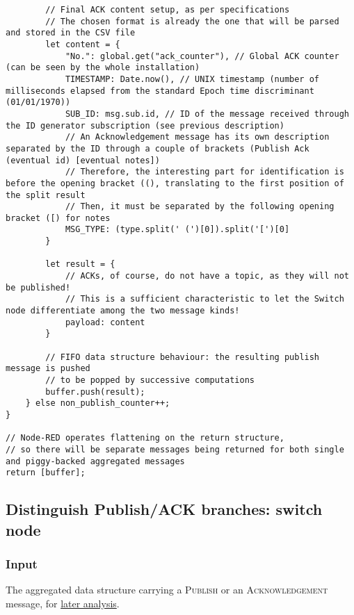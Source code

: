 \documentclass[a4paper,11pt]{article} %
\begin{document}
\begin{verbatim}
        // Final ACK content setup, as per specifications
        // The chosen format is already the one that will be parsed and stored in the CSV file
        let content = {
            "No.": global.get("ack_counter"), // Global ACK counter (can be seen by the whole installation)
            TIMESTAMP: Date.now(), // UNIX timestamp (number of milliseconds elapsed from the standard Epoch time discriminant (01/01/1970))
            SUB_ID: msg.sub.id, // ID of the message received through the ID generator subscription (see previous description)
            // An Acknowledgement message has its own description separated by the ID through a couple of brackets (Publish Ack (eventual id) [eventual notes])
            // Therefore, the interesting part for identification is before the opening bracket ((), translating to the first position of the split result
            // Then, it must be separated by the following opening bracket ([) for notes
            MSG_TYPE: (type.split(' (')[0]).split('[')[0]
        }

        let result = {
            // ACKs, of course, do not have a topic, as they will not be published!
            // This is a sufficient characteristic to let the Switch node differentiate among the two message kinds!
            payload: content
        }

        // FIFO data structure behaviour: the resulting publish message is pushed
        // to be popped by successive computations
        buffer.push(result);
    } else non_publish_counter++;
}

// Node-RED operates flattening on the return structure,
// so there will be separate messages being returned for both single and piggy-backed aggregated messages
return [buffer];
    \end{verbatim}

    \subsection{Distinguish Publish/ACK branches: switch node}\label{subsec:distinguish-publish/ack-branches:-switch-node}

    \subsubsection{Input}

    The aggregated data structure carrying a \textsc{Publish} or an \textsc{Acknowledgement} message, for \hyperref[subsec:prepare-temperatures-for-csv-storage:-function-and-csv-formatting-node]{later analysis}.
\end{document}
